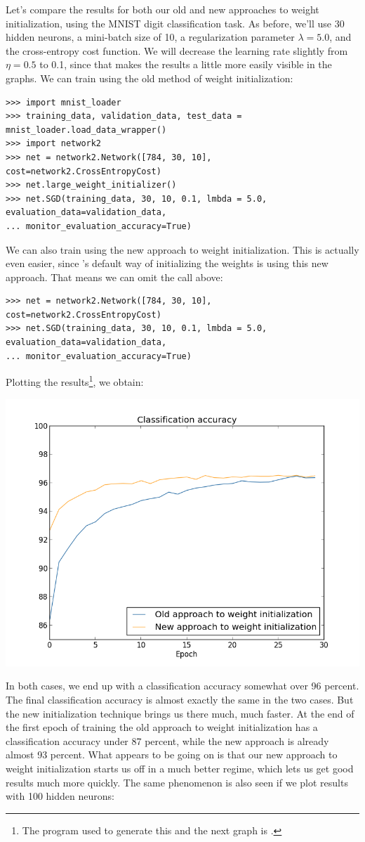 \documentclass[a4paper,twoside,10pt]{book}
\begin{document}
Let's compare the results for both our old and new approaches to weight initialization, using the MNIST digit classification task. As before, we'll use 30 hidden neurons, a mini-batch size of 10, a regularization parameter $\lambda=5.0$, and the cross-entropy cost function. We will decrease the learning rate slightly from $\eta=0.5$ to 0.1, since that makes the results a little more easily visible in the graphs. We can train using the old method of weight initialization:
\begin{lstlisting}
>>> import mnist_loader
>>> training_data, validation_data, test_data =  mnist_loader.load_data_wrapper()
>>> import network2
>>> net = network2.Network([784, 30, 10], cost=network2.CrossEntropyCost)
>>> net.large_weight_initializer()
>>> net.SGD(training_data, 30, 10, 0.1, lmbda = 5.0,  evaluation_data=validation_data, 
... monitor_evaluation_accuracy=True)
\end{lstlisting}
We can also train using the new approach to weight initialization. This is actually even easier, since 's default way of initializing the weights is using this new approach. That means we can omit the  call above: 
\begin{lstlisting}
>>> net = network2.Network([784, 30, 10], cost=network2.CrossEntropyCost)
>>> net.SGD(training_data, 30, 10, 0.1, lmbda = 5.0, evaluation_data=validation_data, 
... monitor_evaluation_accuracy=True)
\end{lstlisting}
Plotting the results\footnote{The program used to generate this and the next graph is .}, we obtain:
\begin{center}
	\includegraphics[width=0.6\linewidth]{figures/ch3/weight_initialization_30}
\end{center}
In both cases, we end up with a classification accuracy somewhat over 96 percent. The final classification accuracy is almost exactly the same in the two cases. But the new initialization technique brings us there much, much faster. At the end of the first epoch of training the old approach to weight initialization has a classification accuracy under 87 percent, while the new approach is already almost 93 percent. What appears to be going on is that our new approach to weight initialization starts us off in a much better regime, which lets us get good results much more quickly. The same phenomenon is also seen if we plot results with 100 hidden neurons:
\end{document}
